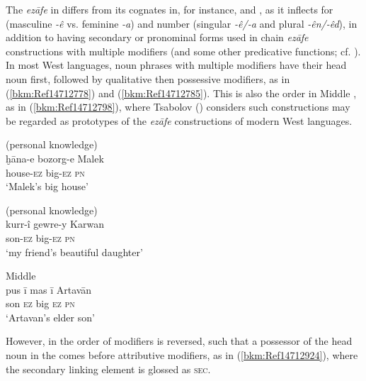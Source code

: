 \documentclass[output=paper]{langsci/langscibook}
\begin{document}

The \textit{ezāfe} in   differs from its cognates in, for instance,   and , as it inflects for  (masculine \textit{{}-ê} vs. feminine \textit{{}-a}) and number (singular \textit{{}-ê/-a} and plural \textit{{}-ên/-êd}), in addition to having secondary or pronominal forms used in chain \textit{ezāfe} constructions with multiple modifiers (and some other predicative functions; cf. \citealt{Haig2011,HaigÖpengin2018}). In most West  languages, noun phrases with multiple modifiers have their head noun first, followed by qualitative then possessive modifiers, as in (\ref{bkm:Ref14712778}) and (\ref{bkm:Ref14712785}). This is also the order in Middle , as in (\ref{bkm:Ref14712798}), where Tsabolov (\citeyear[122]{Tsabolov1994}) considers such constructions may be regarded as prototypes of the \textit{ezāfe} constructions of modern West  languages. 

\ea\label{bkm:Ref14712778} (personal knowledge)\\
\gll ḫāna-e bozorg-e Malek\\
     house-\textsc{ez} big-\textsc{ez} \textsc{pn}\\
\glt ‘Malek’s big house’
\z

\ea\label{bkm:Ref14712785}\label{bkm:Ref14771780}   (personal knowledge)\\
\gll kurr-î gewre-y Karwan\\
     son-\textsc{ez} big-\textsc{ez} \textsc{pn}\\
\glt ‘my friend’s beautiful daughter’
\z

\ea\label{bkm:Ref14712798}Middle  \citep[122]{Tsabolov1994}\\
\gll pus ī mas ī Artavān\\
     son \textsc{ez} big \textsc{ez} \textsc{pn}\\
\glt ‘Artavan’s elder son’
\z

However, in   the order of modifiers is reversed, such that a possessor of the head noun in the  comes before attributive modifiers, as in (\ref{bkm:Ref14712924}), where the secondary linking element is glossed as \textsc{sec}.  
\end{document}
